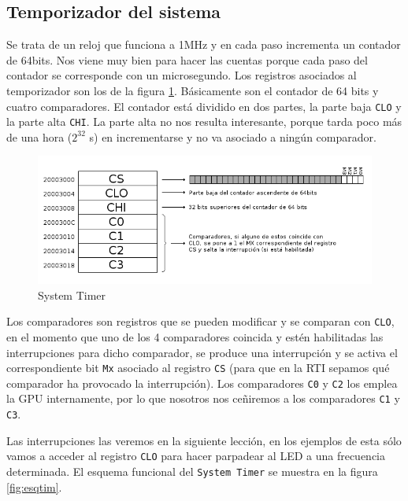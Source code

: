 \subsection{Temporizador del sistema}

Se trata de un reloj que funciona a 1MHz y en cada paso incrementa un contador de 64bits. Nos
viene muy bien para hacer las cuentas porque cada paso del contador se corresponde con un
microsegundo. Los registros asociados al temporizador son los de la figura \ref{fig:systim}.
Básicamente son el contador de 64 bits y cuatro comparadores. El contador está dividido en
dos partes, la parte baja {\tt CLO} y la parte alta {\tt CHI}. La parte alta no nos resulta
interesante, porque tarda poco más de una hora ($2^{32}$ \micro s) en incrementarse y no
va asociado a ningún comparador.

\begin{figure}[h]
  \centering
    \includegraphics[width=14cm]{graphs/systemtimer.png}
  \caption{System Timer}
  \label{fig:systim}
\end{figure}

Los comparadores son registros que se pueden modificar y se comparan con {\tt CLO}, en el momento
que uno de los 4 comparadores coincida y estén habilitadas las interrupciones para dicho
comparador, se produce una interrupción y se activa el correspondiente bit {\tt Mx}
asociado al registro {\tt CS} (para que en la RTI sepamos qué comparador ha provocado la interrupción).
Los comparadores {\tt C0} y {\tt C2} los emplea la GPU internamente, por lo que nosotros nos
ceñiremos a los comparadores {\tt C1} y {\tt C3}.

Las interrupciones las veremos en la siguiente lección, en los ejemplos de esta sólo vamos
a acceder al registro {\tt CLO} para hacer parpadear al LED a una frecuencia determinada. El
esquema funcional del {\tt System Timer} se muestra en la figura \ref{fig:esqtim}.

